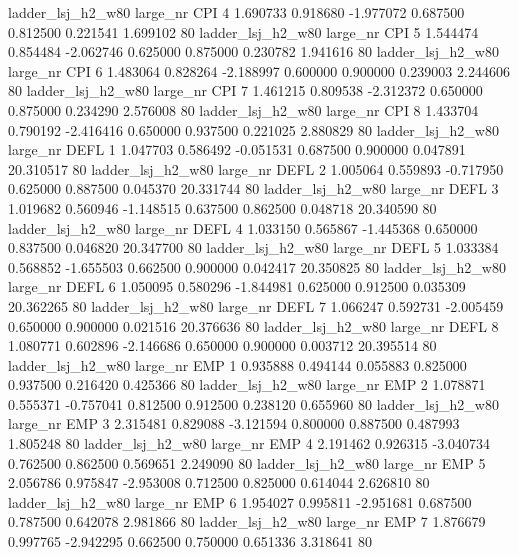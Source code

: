   ladder_lsj_h2_w80   large_nr      CPI                 4  1.690733  0.918680  -1.977072 0.687500 0.812500  0.221541    1.699102 80
  ladder_lsj_h2_w80   large_nr      CPI                 5  1.544474  0.854484  -2.062746 0.625000 0.875000  0.230782    1.941616 80
  ladder_lsj_h2_w80   large_nr      CPI                 6  1.483064  0.828264  -2.188997 0.600000 0.900000  0.239003    2.244606 80
  ladder_lsj_h2_w80   large_nr      CPI                 7  1.461215  0.809538  -2.312372 0.650000 0.875000  0.234290    2.576008 80
  ladder_lsj_h2_w80   large_nr      CPI                 8  1.433704  0.790192  -2.416416 0.650000 0.937500  0.221025    2.880829 80
  ladder_lsj_h2_w80   large_nr     DEFL                 1  1.047703  0.586492  -0.051531 0.687500 0.900000  0.047891   20.310517 80
  ladder_lsj_h2_w80   large_nr     DEFL                 2  1.005064  0.559893  -0.717950 0.625000 0.887500  0.045370   20.331744 80
  ladder_lsj_h2_w80   large_nr     DEFL                 3  1.019682  0.560946  -1.148515 0.637500 0.862500  0.048718   20.340590 80
  ladder_lsj_h2_w80   large_nr     DEFL                 4  1.033150  0.565867  -1.445368 0.650000 0.837500  0.046820   20.347700 80
  ladder_lsj_h2_w80   large_nr     DEFL                 5  1.033384  0.568852  -1.655503 0.662500 0.900000  0.042417   20.350825 80
  ladder_lsj_h2_w80   large_nr     DEFL                 6  1.050095  0.580296  -1.844981 0.625000 0.912500  0.035309   20.362265 80
  ladder_lsj_h2_w80   large_nr     DEFL                 7  1.066247  0.592731  -2.005459 0.650000 0.900000  0.021516   20.376636 80
  ladder_lsj_h2_w80   large_nr     DEFL                 8  1.080771  0.602896  -2.146686 0.650000 0.900000  0.003712   20.395514 80
  ladder_lsj_h2_w80   large_nr      EMP                 1  0.935888  0.494144   0.055883 0.825000 0.937500  0.216420    0.425366 80
  ladder_lsj_h2_w80   large_nr      EMP                 2  1.078871  0.555371  -0.757041 0.812500 0.912500  0.238120    0.655960 80
  ladder_lsj_h2_w80   large_nr      EMP                 3  2.315481  0.829088  -3.121594 0.800000 0.887500  0.487993    1.805248 80
  ladder_lsj_h2_w80   large_nr      EMP                 4  2.191462  0.926315  -3.040734 0.762500 0.862500  0.569651    2.249090 80
  ladder_lsj_h2_w80   large_nr      EMP                 5  2.056786  0.975847  -2.953008 0.712500 0.825000  0.614044    2.626810 80
  ladder_lsj_h2_w80   large_nr      EMP                 6  1.954027  0.995811  -2.951681 0.687500 0.787500  0.642078    2.981866 80
  ladder_lsj_h2_w80   large_nr      EMP                 7  1.876679  0.997765  -2.942295 0.662500 0.750000  0.651336    3.318641 80
